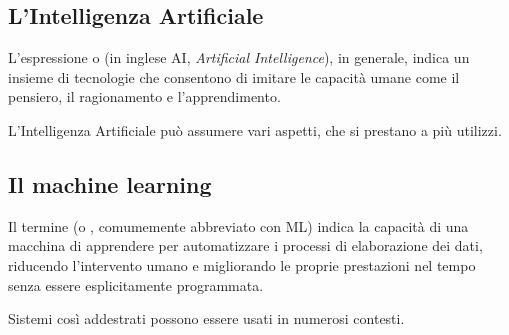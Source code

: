 \documentclass[
    notheorems,
    11pt,
    compress,
    aspectratio=169
]{beamer}
\begin{document}
\subsection{L'Intelligenza Artificiale}

\begin{frame}

    L'espressione \textbf{} o \textbf{} (in inglese AI, \textit{Artificial Intelligence}), in generale, indica un insieme di tecnologie che consentono di imitare le capacità umane come il pensiero, il ragionamento e l'apprendimento.

    \vspace{\baselineskip}

    L'Intelligenza Artificiale può assumere vari aspetti, che si prestano a più utilizzi.
\end{frame}


\subsection{Il machine learning}

\begin{frame}

    Il termine \textbf{} (o \textbf{}, comumemente abbreviato con ML) indica la capacità di una macchina di apprendere per automatizzare i processi di elaborazione dei dati, riducendo l'intervento umano e migliorando le proprie prestazioni nel tempo senza essere esplicitamente programmata.

    \vspace{\baselineskip}

    Sistemi così addestrati possono essere usati in numerosi contesti.
\end{frame}
\end{document}
